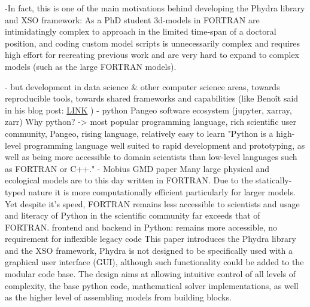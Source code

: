 \documentclass[journal abbreviation, manuscript]{copernicus}
\begin{document}
-In fact, this is one of the main motivations behind developing the Phydra library and XSO framework: As a PhD student 3d-models in FORTRAN are intimidatingly complex to approach in the limited time-span of a doctoral position, and coding custom model scripts is unnecessarily complex and requires high effort for recreating previous work and are very hard to expand to complex models (such as the large FORTRAN models).

- but development in data science \& other computer science areas, towards reproducible tools, towards shared frameworks and capabilities (like Benoît said in his blog post: \href{https://medium.com/pangeo/pangeo-data-and-models-280b251ff0cd}{LINK} )
- python Pangeo software ecosystem (jupyter, xarray, zarr)
Why python? -> most popular programming language, rich scientific user community, Pangeo, rising language, relatively easy to learn
"Python is a high-level programming language well suited to rapid development and prototyping, as well as being more accessible to domain scientists than low-level languages such as FORTRAN or C++." - Mobius GMD paper
Many large physical and ecological models are to this day written in FORTRAN. Due to the statically-typed nature it is more computationally efficient particularly for larger models. Yet despite it's speed, FORTRAN remains less accessible to scientists and usage and literacy of Python in the scientific community far exceeds that of FORTRAN.
frontend and backend in Python: remains more accessible, no requirement for inflexible legacy code
%
This paper introduces the Phydra library and the XSO framework,
Phydra is not designed to be specifically used with a graphical user interface (GUI), although such functionality could be added to the modular code base.
The design aims at allowing intuitive control of all levels of complexity, the base python code, mathematical solver implementations, as well as the higher level of assembling models from building blocks.
\end{document}

